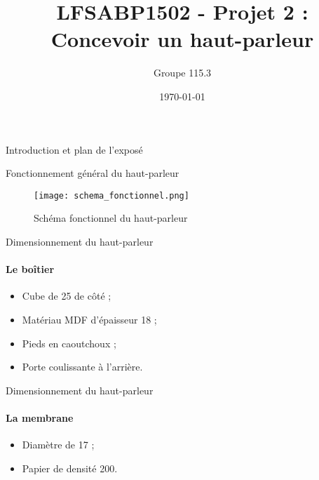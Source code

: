 \documentclass[pdf]{beamer}
\title{LFSABP1502 - Projet 2 : Concevoir un haut-parleur}
\author{Groupe 115.3}
\date{\today}
\begin{document}
\begin{frame}
\titlepage
\end{frame}

\begin{frame}{Introduction et plan de l'exposé}

\end{frame}

\begin{frame}{Fonctionnement général du haut-parleur}
\begin{figure}[ht!]
    \centering
    \texttt{[image: schema\_fonctionnel.png]}
    \caption{Schéma fonctionnel du haut-parleur}
    \label{schema_fonctionnel}
\end{figure}
\end{frame}

\begin{frame}{Dimensionnement du haut-parleur}
	\framesubtitle{Le boîtier}
		\begin{itemize}
			\item Cube de \unit{25}{\centi\meter} de côté ;
			\item Matériau MDF d'épaisseur \unit{18}{\milli\meter} ;
			\item Pieds en caoutchoux ;
			\item Porte coulissante à l'arrière.
		\end{itemize}
		
\end{frame}

\begin{frame}{Dimensionnement du haut-parleur}
	\framesubtitle{La membrane}
		\begin{itemize}
			\item Diamètre de \unit{17}{\centi\meter} ;
			\item Papier de densité \unit{200}{\gram\per\meter\squared}.
		\end{itemize}
		
\end{frame}
\end{document}
